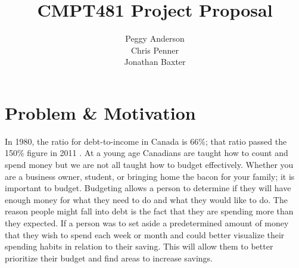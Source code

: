 \documentclass{chi2011}
\begin{document}
\setlength{\paperheight}{11in}
\setlength{\paperwidth}{8.5in}
\setlength{\pdfpageheight}{\paperheight}
\setlength{\pdfpagewidth}{\paperwidth}


\title{CMPT481 Project Proposal}
\author{
\alignauthor Peggy Anderson\\
    \alignauthor Chris Penner\\
    \alignauthor Jonathan Baxter\\
}


\maketitle

\section{Problem \& Motivation}

In 1980, the ratio for debt-to-income in Canada is 66\%; that ratio passed the 150\% figure in 2011 \autocite[1]{STATSCAN:1}. At a young age
Canadians are taught how to count and spend money but we are not all taught how to budget effectively. Whether you are
a business owner, student, or bringing home the bacon for your family; it is important to budget. Budgeting allows a
person to determine if they will have enough money for what they need to do and what they would like to do. The reason
people might fall into debt is the fact that they are spending more than they expected. If a person was to set aside a
predetermined amount of money that they wish to spend each week or month and could better visualize their spending
habits in relation to their saving. This will allow them to better prioritize their budget and find areas to increase
savings.
\end{document}
